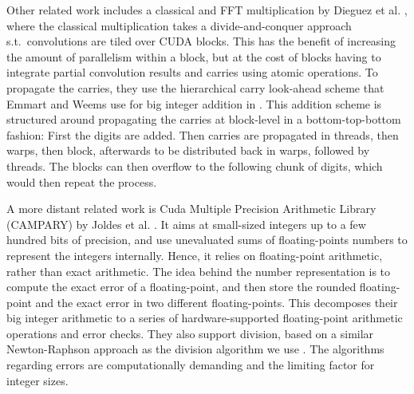 Other related work includes a classical and FFT multiplication by Dieguez et
al. \cite{doi:10.1177/10943420221077964}, where the classical multiplication
takes a divide-and-conquer approach s.t.\ convolutions are tiled over CUDA
blocks. This has the benefit of increasing the amount of parallelism within a
block, but at the cost of blocks having to integrate partial convolution results
and carries using atomic operations. To propagate the carries, they use the
hierarchical carry look-ahead scheme that Emmart and Weems use for big integer
addition in \cite{Emmart2010HighPI}. This addition scheme is structured around
propagating the carries at block-level in a bottom-top-bottom fashion: First the
digits are added. Then carries are propagated in threads, then warps, then
block, afterwards to be distributed back in warps, followed by threads. The
blocks can then overflow to the following chunk of digits, which would then
repeat the process.

A more distant related work is Cuda Multiple Precision Arithmetic Library
(CAMPARY) by Joldes et al. \cite{Joldes2016CAMPARYCM}. It aims at small-sized
integers up to a few hundred bits of precision, and use unevaluated sums of
floating-points numbers to represent the integers internally. Hence, it relies
on floating-point arithmetic, rather than exact arithmetic. The idea behind the
number representation is to compute the exact error of a floating-point, and
then store the rounded floating-point and the exact error in two different
floating-points. This decomposes their big integer arithmetic to a series of
hardware-supported floating-point arithmetic operations and error checks. They
also support division, based on a similar Newton-Raphson approach as the
division algorithm we use \cite{watt2023efficient}. The algorithms regarding
errors are computationally demanding and the limiting factor for integer sizes.

